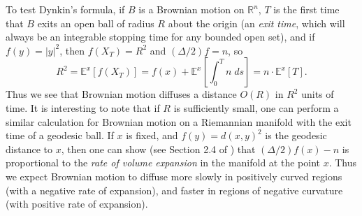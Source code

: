 \documentclass[12pt]{article}
\newcommand*{\R}{\mathbb{R}}
\begin{document}
%
To test Dynkin's formula, if $B$ is a Brownian motion on $\R^n$, $T$ is the first time that $B$ exits an open ball of radius $R$ about the origin (an \emph{exit time}, which will always be an integrable stopping time for any bounded open set), and if $f(y) = |y|^2$, then $f(X_T) = R^2$ and $(\Delta/2) f = n$, so
%
\[ R^2 = \mathbb{E}^x[f(X_T)] = f(x) + \mathbb{E}^x \left[ \int_0^T n\; ds \right] = n \cdot \mathbb{E}^x[T]. \]
%
Thus we see that Brownian motion diffuses a distance $O(R)$ in $R^2$ units of time. It is interesting to note that if $R$ is sufficiently small, one can perform a similar calculation for Brownian motion on a Riemannian manifold with the exit time of a geodesic ball. If $x$ is fixed, and $f(y) = d(x,y)^2$ is the geodesic distance to $x$, then one can show (see Section 2.4 of \cite{rosenberg}) that $(\Delta/2) f(x) - n$ is proportional to the \emph{rate of volume expansion} in the manifold at the point $x$.
Thus we expect Brownian motion to diffuse more slowly in positively curved regions (with a negative rate of expansion), and faster in regions of negative curvature (with positive rate of expansion).
\end{document}
